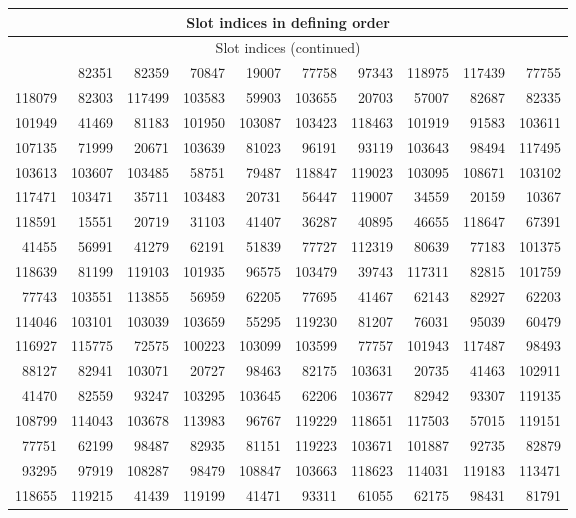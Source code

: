 \documentclass[11pt]{article}
\numberwithin{equation}{section}
\theoremstyle{definition}
\theoremstyle{remark}
\begin{document}
{\scriptsize\setlength{\tabcolsep}{5pt}\begin{longtable}{rrrrrrrrrr}
\toprule\multicolumn{10}{c}{Slot indices in defining order}\\\midrule\endfirsthead
\toprule\multicolumn{10}{c}{Slot indices (continued)}\\\midrule\endhead
\bottomrule\endfoot
20543 & 82351 & 82359 & 70847 & 19007 & 77758 & 97343 & 118975 & 117439 & 77755\\
118079 & 82303 & 117499 & 103583 & 59903 & 103655 & 20703 & 57007 & 82687 & 82335\\
101949 & 41469 & 81183 & 101950 & 103087 & 103423 & 118463 & 101919 & 91583 & 103611\\
107135 & 71999 & 20671 & 103639 & 81023 & 96191 & 93119 & 103643 & 98494 & 117495\\
103613 & 103607 & 103485 & 58751 & 79487 & 118847 & 119023 & 103095 & 108671 & 103102\\
117471 & 103471 & 35711 & 103483 & 20731 & 56447 & 119007 & 34559 & 20159 & 10367\\
118591 & 15551 & 20719 & 31103 & 41407 & 36287 & 40895 & 46655 & 118647 & 67391\\
41455 & 56991 & 41279 & 62191 & 51839 & 77727 & 112319 & 80639 & 77183 & 101375\\
118639 & 81199 & 119103 & 101935 & 96575 & 103479 & 39743 & 117311 & 82815 & 101759\\
77743 & 103551 & 113855 & 56959 & 62205 & 77695 & 41467 & 62143 & 82927 & 62203\\
114046 & 103101 & 103039 & 103659 & 55295 & 119230 & 81207 & 76031 & 95039 & 60479\\
116927 & 115775 & 72575 & 100223 & 103099 & 103599 & 77757 & 101943 & 117487 & 98493\\
88127 & 82941 & 103071 & 20727 & 98463 & 82175 & 103631 & 20735 & 41463 & 102911\\
41470 & 82559 & 93247 & 103295 & 103645 & 62206 & 103677 & 82942 & 93307 & 119135\\
108799 & 114043 & 103678 & 113983 & 96767 & 119229 & 118651 & 117503 & 57015 & 119151\\
77751 & 62199 & 98487 & 82935 & 81151 & 119223 & 103671 & 101887 & 92735 & 82879\\
93295 & 97919 & 108287 & 98479 & 108847 & 103663 & 118623 & 114031 & 119183 & 113471\\
118655 & 119215 & 41439 & 119199 & 41471 & 93311 & 61055 & 62175 & 98431 & 81791\\

\end{longtable}}
\end{document}
